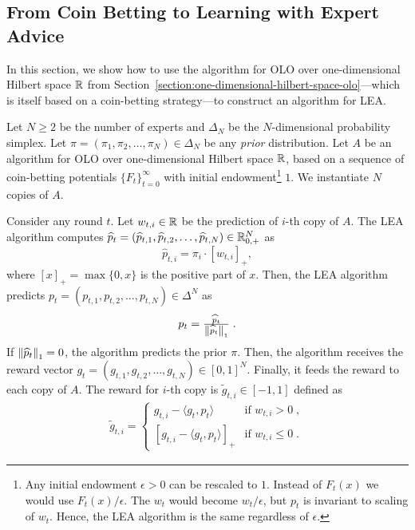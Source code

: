 \subsection{From Coin Betting to Learning with Expert Advice}
\label{section:reduction-experts}

In this section, we show how to use the algorithm for OLO over one-dimensional
Hilbert space $\mathbb{R}$ from
Section~\ref{section:one-dimensional-hilbert-space-olo}---which is itself based
on a coin-betting strategy---to construct an algorithm for \ac{LEA}.

\vspace{-0.05cm}

Let $N \ge 2$ be the number of experts and $\Delta_N$ be the $N$-dimensional
probability simplex. Let $\pi = (\pi_1, \pi_2, \dots, \pi_N) \in \Delta_N$ be
any \emph{prior} distribution. Let $A$ be an algorithm for OLO over
one-dimensional Hilbert space $\mathbb{R}$, based on a sequence of coin-betting
potentials $\{F_t\}_{t=0}^\infty$ with initial endowment\footnote{Any initial
endowment $\epsilon > 0$ can be rescaled to $1$. Instead of $F_t(x)$ we would
use $F_t(x)/\epsilon$. The $w_t$ would become $w_t/\epsilon$, but $p_t$ is
invariant to scaling of $w_t$. Hence, the LEA algorithm is the same regardless
of $\epsilon$.} $1$. We instantiate $N$ copies of $A$.

\vspace{-0.05cm}

Consider any round $t$. Let $w_{t,i} \in \mathbb{R}$ be the prediction of $i$-th copy of
$A$. The LEA algorithm computes $\widehat p_t = (\widehat p_{t,1}, \widehat
p_{t,2}, \dots, \widehat p_{t,N}) \in \mathbb{R}_{0,+}^N$ as
\begin{equation}
\label{eq:phat}
\widehat p_{t,i} = \pi_i \cdot [w_{t,i}]_+,
\end{equation}
where $[x]_+ = \max\{0,x\}$ is the positive part of $x$. Then, the LEA
algorithm predicts $p_t = (p_{t,1}, p_{t,2}, \dots, p_{t,N}) \in \Delta^N$ as
\begin{equation}
\label{eq:preds_experts}
p_t = \tfrac{\widehat p_t}{\left\|{\widehat p_t}\right\|_1} \; .
\end{equation}
If $\left\|{\widehat p_t}\right\|_1 = 0$, the algorithm predicts the prior $\pi$.
Then, the algorithm receives the reward vector
$g_t = (g_{t,1}, g_{t,2}, \dots, g_{t,N}) \in [0,1]^N$. Finally, it
feeds the reward to each copy of $A$. The reward for $i$-th copy is $\widetilde g_{t,i} \in
[-1,1]$ defined as
\begin{align}
\label{eq:gradients_experts_reduction}
\widetilde g_{t,i} =
\begin{cases}
g_{t,i} - \langle g_t, p_t \rangle & \text{if } w_{t,i} > 0 \; , \\
\left[g_{t,i} - \langle g_t, p_t \rangle \right]_+ & \text{if } w_{t,i} \le 0 \; .
\end{cases}
\end{align}

